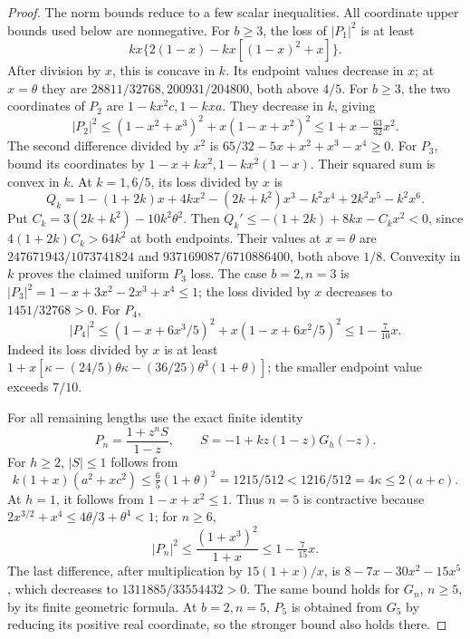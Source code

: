 \begin{proof}
The norm bounds reduce to a few scalar inequalities.
All coordinate upper bounds used below are nonnegative.
For \(b\ge3\), the loss of \(|P_1|^2\) is at least
\[
 kx\{2(1-x)-kx[(1-x)^2+x]\}.
\]
After division by \(x\), this is concave in \(k\). Its endpoint
values decrease in \(x\); at \(x=\theta\) they are
\(28811/32768,200931/204800\), both above \(4/5\).
For \(b\ge3\), the two coordinates of \(P_2\) are \(1-kx^2c,1-kxa\).
They decrease in \(k\), giving
\[
 |P_2|^2\le(1-x^2+x^3)^2+x(1-x+x^2)^2
 \le1+x-\tfrac{63}{32}x^2.
\]
The second difference divided by \(x^2\) is
\(65/32-5x+x^2+x^3-x^4\ge0\).
For \(P_3\), bound its coordinates by
\(1-x+kx^2,1-kx^2(1-x)\). Their squared sum is convex in \(k\).
At \(k=1,6/5\), its loss divided by \(x\) is
\[
 Q_k=1-(1+2k)x+4kx^2-(2k+k^2)x^3-k^2x^4+2k^2x^5-k^2x^6 .
\]
Put \(C_k=3(2k+k^2)-10k^2\theta^2\).
Then \(Q_k'\le-(1+2k)+8kx-C_kx^2<0\), since
\(4(1+2k)C_k>64k^2\) at both endpoints.
Their values at \(x=\theta\) are
\(247671943/1073741824\) and \(937169087/6710886400\), both above \(1/8\).
Convexity in \(k\) proves the claimed uniform \(P_3\) loss.
The case \(b=2,n=3\) is
\(|P_3|^2=1-x+3x^2-2x^3+x^4\le1\);
the loss divided by \(x\) decreases to \(1451/32768>0\).
For \(P_4\),
\[
 |P_4|^2\le(1-x+6x^3/5)^2+x(1-x+6x^2/5)^2
 \le1-\tfrac7{10}x .
\]
Indeed its loss divided by \(x\) is at least
\(1+x[\kappa-(24/5)\theta\kappa-(36/25)\theta^3(1+\theta)]\);
the smaller endpoint value exceeds \(7/10\).

For all remaining lengths use the exact finite identity
\[
 P_n=\frac{1+z^nS}{1-z},\qquad
 S=-1+kz(1-z)G_h(-z).
\]
For \(h\ge2\), \(|S|\le1\) follows from
\[
 k(1+x)(a^2+xc^2)\le\tfrac65(1+\theta)^2
   =1215/512<1216/512=4\kappa\le2(a+c).
\]
At \(h=1\), it follows from \(1-x+x^2\le1\).
Thus \(n=5\) is contractive because
\(2x^{3/2}+x^4\le4\theta/3+\theta^4<1\);
for \(n\ge6\),
\[
 |P_n|^2\le\frac{(1+x^3)^2}{1+x}\le1-\tfrac7{15}x .
\]
The last difference, after multiplication by \(15(1+x)/x\),
is \(8-7x-30x^2-15x^5\), which decreases to
\(1311885/33554432>0\).
The same bound holds for \(G_n\), \(n\ge5\), by its finite
geometric formula. At \(b=2,n=5\), \(P_5\) is obtained from
\(G_5\) by reducing its positive real coordinate, so the stronger
bound also holds there.


\end{proof}
